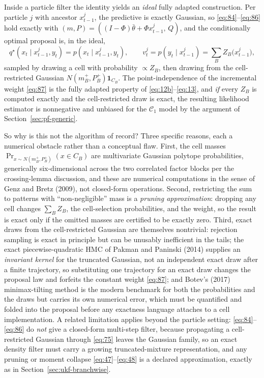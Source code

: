 \documentclass[11pt]{article}
\begin{document}
Inside a particle filter the identity yields an \emph{ideal} fully
adapted construction. Per particle \(j\) with ancestor \(x_{t-1}^j\),
the predictive is exactly Gaussian, so \eqref{eq:84}--\eqref{eq:86}
hold exactly with
\((m,P)=((I-\Phi)\bar\theta+\Phi x_{t-1}^j,\,Q)\), and the
conditionally optimal proposal is, in the ideal,
\begin{equation}\label{eq:87}
 q^\star(x_t\mid x_{t-1}^j,y_t)=p(x_t\mid x_{t-1}^j,y_t),
 \qquad
 v_t^j=p(y_t\mid x_{t-1}^j)=\sum_B Z_B\bigl(x_{t-1}^j\bigr),
\end{equation}
sampled by drawing a cell with probability \(\propto Z_B\), then
drawing from the cell-restricted Gaussian
\(N(m_B^+,P_B^+)\mathbf 1_{C_B}\). The point-independence of the
incremental weight \eqref{eq:87} is the fully adapted property of
\eqref{eq:12b}--\eqref{eq:13}, and \emph{if} every \(Z_B\) is computed
exactly and the cell-restricted draw is exact, the resulting likelihood
estimator is nonnegative and unbiased for the \(\mathcal C_1\) model by
the argument of Section~\ref{sec:pf-generic}.

So why is this not the algorithm of record? Three specific reasons,
each a numerical obstacle rather than a conceptual flaw. First,
the cell masses \(\Pr_{x\sim N(m_B^+,P_B^+)}(x\in C_B)\) are
multivariate Gaussian polytope probabilities, generically
six-dimensional across the two correlated factor blocks per the
crossing-lemma discussion, and these are numerical computations in
the sense of Genz and Bretz (2009), not closed-form operations.
Second, restricting the sum to patterns with ``non-negligible'' mass is
a \emph{pruning approximation}: dropping any cell changes
\(\sum_B Z_B\), the cell-selection probabilities, and the weight, so
the result is exact only if the omitted masses are certified to be
exactly zero. Third, exact draws from the cell-restricted Gaussian are
themselves nontrivial: rejection sampling is exact in principle but can
be unusably inefficient in the tails; the exact piecewise-quadratic HMC
of Pakman and Paninski (2014) supplies an \emph{invariant kernel} for
the truncated Gaussian, not an independent exact draw after a finite
trajectory, so substituting one trajectory for an exact draw changes
the proposal law and forfeits the constant weight \eqref{eq:87}; and
Botev's (2017) minimax-tilting method is the modern benchmark for both
the probabilities and the draws but carries its own numerical error,
which must be quantified and folded into the proposal before any
exactness language attaches to a cell implementation. A related
limitation applies beyond the particle setting: \eqref{eq:84}--\eqref{eq:86}
do \emph{not} give a closed-form multi-step filter, because propagating
a cell-restricted Gaussian through \eqref{eq:75} leaves the Gaussian
family, so an exact density filter must carry a growing
truncated-mixture representation, and any pruning or moment collapse
\eqref{eq:47}--\eqref{eq:48} is a declared approximation, exactly as in
Section~\ref{sec:ukf-branchwise}.
\end{document}
